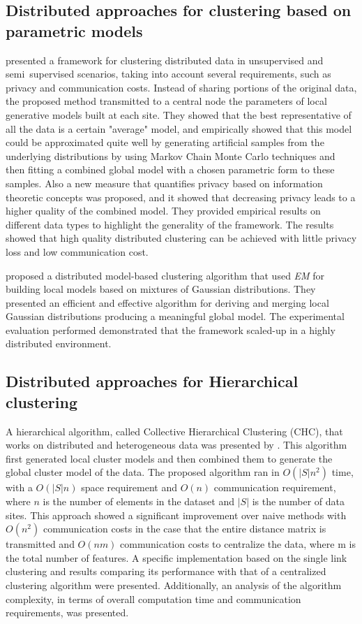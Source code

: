 \documentclass[10pt]{article}
\begin{document}
\subsection{Distributed approaches for clustering based on parametric models}

\citep{MG03} presented a framework for clustering distributed data in unsupervised and semi~supervised scenarios, taking into account several requirements, such as privacy and communication costs. Instead of sharing portions of the original data, the proposed method transmitted to a central node the parameters of local generative models built at each site. They showed that the best representative of all the data is a certain "average" model, and empirically showed that this model
could be approximated quite well by generating artificial samples from the underlying distributions by using Markov Chain Monte Carlo techniques and then fitting a combined global model with a chosen parametric form to these samples. Also a new measure that quantifies privacy based on information theoretic concepts was proposed, and it showed that decreasing privacy leads to a higher quality of the combined model. They provided empirical results on different data types to highlight the
generality of the framework. The results showed that high quality distributed clustering can be achieved with little privacy loss and low communication cost.

\citep{KKPS05} proposed a distributed model-based clustering algorithm that used \textit{EM} for building local models based on mixtures of Gaussian distributions. They presented an efficient and effective algorithm for de\-ri\-ving and merging  local Gaussian distributions producing a meaningful global model. The experimental evaluation performed  demonstrated that the framework scaled-up in a highly distributed environment.

\subsection{Distributed approaches for Hierarchical clustering}

A hierarchical algorithm, called Collective Hierarchical Clustering (CHC), that works on distributed and heterogeneous data was presented by \citep{JK00}.  This algorithm first generated local cluster models and then combined them to generate the global cluster model of the data. The proposed algorithm ran in $O(|S|n^2)$ time, with a $O(|S|n)$ space requirement and $O(n)$ communication requirement, where $n$ is the number of elements in the dataset and $|S|$ is the number of data sites. 
This approach showed a significant improvement over naive methods with $O(n^2)$ communication costs in the case that the entire distance matrix is transmitted and $O(nm)$ communication costs to centralize the data, where m is the total number of features. A specific implementation based on the single link clustering and results comparing its performance with that of a centralized clustering algorithm were presented. Additionally, an analysis of the algorithm complexity, in terms of overall computation time and communication requirements, was presented.
\end{document}
